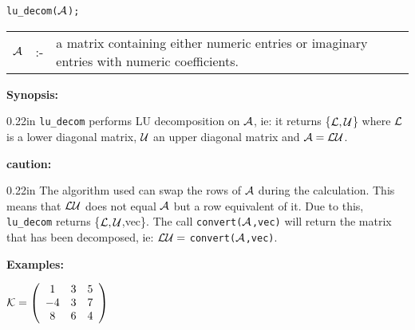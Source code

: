 \hspace*{0.175in} {\tt lu\_decom(${\cal A}$);}

\hspace*{0.1in} 
\begin{tabular}{l l l}
${\cal A}$ &:-& \parbox[t]{.848\linewidth}{a matrix containing either 
numeric entries or imaginary entries with numeric coefficients.}
\end{tabular}

{\bf Synopsis:} %

\begin{addtolength}{\leftskip}{0.22in}
              {\tt lu\_decom} performs LU decomposition on ${\cal A}$,
              ie: it returns \{${\cal L,U}$\} where ${\cal L}$
              is a lower diagonal matrix, ${\cal U}$ an upper diagonal
              matrix and ${\cal A} = {\cal LU}$.

\end{addtolength}

{\bf caution:}

\begin{addtolength}{\leftskip}{0.22in}
The algorithm used can swap the rows of ${\cal A}$ 
                during the calculation. This means that ${\cal LU}$ does
                not equal ${\cal A}$ but a row equivalent of it. Due to
                this, {\tt lu\_decom} returns \{${\cal L,U}$,vec\}. The
                call {\tt convert(${\cal A}$,vec)} will return the 
                matrix that has been decomposed, ie: ${\cal LU} = $
                {\tt convert(${\cal A}$,vec)}.

\end{addtolength}

{\bf Examples:}

\begin{flushleft}
\hspace*{0.175in}
\begin{math}  
{\cal K} = \left( \begin{array}{ccc} 1 & 3 & 5 \\ -4 & 3 & 7 \\ 8 & 6 & 
4
\end{array} \right)
\end{math}  
\end{flushleft}

